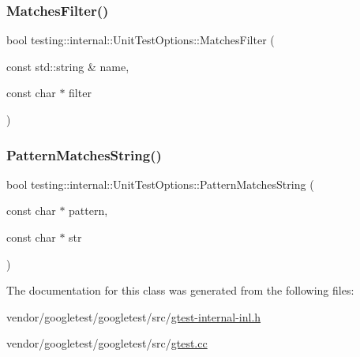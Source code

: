 \mbox{\label{classtesting_1_1internal_1_1_unit_test_options_a67fc0adaffbb8d320b92e42e05017e4e}} 
\subsubsection{\texorpdfstring{Matches\+Filter()}{MatchesFilter()}}
{\footnotesize\ttfamily bool testing\+::internal\+::\+Unit\+Test\+Options\+::\+Matches\+Filter (\begin{DoxyParamCaption}\item[{const std\+::string \&}]{name,  }\item[{const char $\ast$}]{filter }\end{DoxyParamCaption})\hspace{0.3cm}{\ttfamily [static]}}

\mbox{\label{classtesting_1_1internal_1_1_unit_test_options_af0235a2ee26dd6db21305e11d2358e4f}} 
\subsubsection{\texorpdfstring{Pattern\+Matches\+String()}{PatternMatchesString()}}
{\footnotesize\ttfamily bool testing\+::internal\+::\+Unit\+Test\+Options\+::\+Pattern\+Matches\+String (\begin{DoxyParamCaption}\item[{const char $\ast$}]{pattern,  }\item[{const char $\ast$}]{str }\end{DoxyParamCaption})\hspace{0.3cm}{\ttfamily [static]}}



The documentation for this class was generated from the following files\+:\begin{DoxyCompactItemize}
\item 
vendor/googletest/googletest/src/\hyperlink{gtest-internal-inl_8h}{gtest-\/internal-\/inl.\+h}\item 
vendor/googletest/googletest/src/\hyperlink{gtest_8cc}{gtest.\+cc}\end{DoxyCompactItemize}
